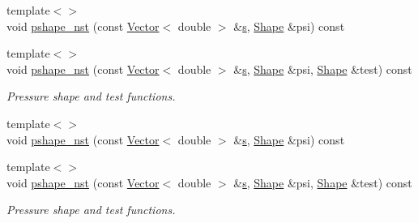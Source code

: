 \begin{DoxyCompactItemize}
{\footnotesize template$<$$>$ }\\void \hyperlink{classoomph_1_1GeneralisedNewtonianTCrouzeixRaviartElement_a5de86cc3b673bfe4a8a6ba03fc3e1825}{pshape\+\_\+nst} (const \hyperlink{classoomph_1_1Vector}{Vector}$<$ double $>$ \&\hyperlink{cfortran_8h_ab7123126e4885ef647dd9c6e3807a21c}{s}, \hyperlink{classoomph_1_1Shape}{Shape} \&psi) const
\item 
{\footnotesize template$<$$>$ }\\void \hyperlink{classoomph_1_1GeneralisedNewtonianTCrouzeixRaviartElement_a566a1f5f33884ebac7995fef3fca1ccd}{pshape\+\_\+nst} (const \hyperlink{classoomph_1_1Vector}{Vector}$<$ double $>$ \&\hyperlink{cfortran_8h_ab7123126e4885ef647dd9c6e3807a21c}{s}, \hyperlink{classoomph_1_1Shape}{Shape} \&psi, \hyperlink{classoomph_1_1Shape}{Shape} \&test) const
\begin{DoxyCompactList}\small\item\em Pressure shape and test functions. \end{DoxyCompactList}\item 
{\footnotesize template$<$$>$ }\\void \hyperlink{classoomph_1_1GeneralisedNewtonianTCrouzeixRaviartElement_a877ec432e5495538da93971282762e2f}{pshape\+\_\+nst} (const \hyperlink{classoomph_1_1Vector}{Vector}$<$ double $>$ \&\hyperlink{cfortran_8h_ab7123126e4885ef647dd9c6e3807a21c}{s}, \hyperlink{classoomph_1_1Shape}{Shape} \&psi) const
\item 
{\footnotesize template$<$$>$ }\\void \hyperlink{classoomph_1_1GeneralisedNewtonianTCrouzeixRaviartElement_a2fb667e5e88e526f2ff3fc9077488c2e}{pshape\+\_\+nst} (const \hyperlink{classoomph_1_1Vector}{Vector}$<$ double $>$ \&\hyperlink{cfortran_8h_ab7123126e4885ef647dd9c6e3807a21c}{s}, \hyperlink{classoomph_1_1Shape}{Shape} \&psi, \hyperlink{classoomph_1_1Shape}{Shape} \&test) const
\begin{DoxyCompactList}\small\item\em Pressure shape and test functions. \end{DoxyCompactList}\end{DoxyCompactItemize}
